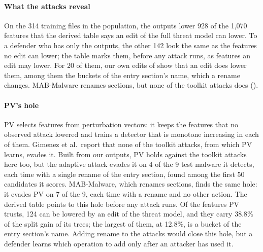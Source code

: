 \paragraph{What the attacks reveal}
On the 314 training files in the population, the outputs lower 928 of the 1,070 features that the derived table says
an edit of the full threat model can lower. To a defender who has only the outputs, the other 142 look the same as the
features no edit can lower; the table marks them, before any attack runs, as features an edit may lower. For 20 of them,
our own edits of  show that an edit does lower them, among them the buckets of the entry section's
name, which a rename changes. MAB-Malware renames sections, but none of
the toolkit attacks does ().

\paragraph{PV's hole}
PV selects features from perturbation vectors: it keeps the features that no observed attack lowered and trains a
detector that is monotone increasing in each of them. Gimenez et al.\ report that none of the toolkit attacks, from
which PV learns, evades it. Built from our outputs, PV holds against the toolkit attacks here too, but the adaptive
attack evades it on 4 of the 9 test malware it detects, each time with a single rename of the entry section, found
among the first 50 candidates it scores. MAB-Malware, which renames sections, finds the
same hole: it evades PV on 7 of the 9, each time with a rename and no other action. The derived table points to this
hole before any attack runs. Of the features PV trusts, 124 can be lowered by an edit of the threat model, and they
carry 38.8\% of the split gain of its trees; the largest of them, at 12.8\%, is a bucket of the entry section's name.
Adding rename to the attacks would close this hole, but a defender learns which operation to add only after an
attacker has used it.

